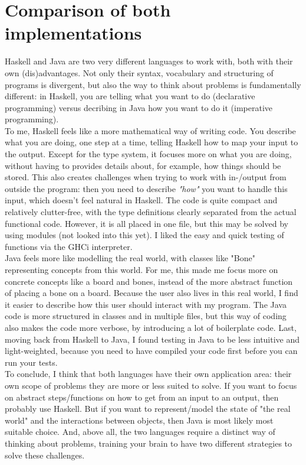 \documentclass[a4paper, 11pt]{article}
\begin{document}
\section{Comparison of both implementations}
Haskell and Java are two very different languages to work with, both with their own (dis)advantages. Not only their syntax, vocabulary and structuring of programs is divergent, but also the way to think about problems is fundamentally different: in Haskell, you are telling what you want to do (declarative programming) versus decribing in Java how you want to do it (imperative programming). \newline 
\\
To me, Haskell feels like a more mathematical way of writing code. You describe what you are doing, one step at a time, telling Haskell how to map your input to the output. Except for the type system, it focuses more on what you are doing, without having to provides details about, for example, how things should be stored. This also creates challenges when trying to work with in-/output from outside the program: then you need to describe \textit{"how"} you want to handle this input, which doesn't feel natural in Haskell. The code is quite compact and relatively clutter-free, with the type definitions clearly separated from the actual functional code. However, it is all placed in one file, but this may be solved by using modules (not looked into this yet). I liked the easy and quick testing of functions via the GHCi interpreter. \newline
\\
Java feels more like modelling the real world, with classes like "Bone" representing concepts from this world. For me, this made me focus more on concrete concepts like a board and bones, instead of the more abstract function of placing a bone on a board. Because the user also lives in this real world, I find it easier to describe how this user should interact with my program. The Java code is more structured in classes and in multiple files, but this way of coding also makes the code more verbose, by introducing a lot of boilerplate code. Last, moving back from Haskell to Java, I found testing in Java to be less intuitive and light-weighted, because you need to have compiled your code first before you can run your tests. \newline
\\
To conclude, I think that both languages have their own application area: their own scope of problems they are more or less suited to solve. If you want to focus on abstract steps/functions on how to get from an input to an output, then probably use Haskell. But if you want to represent/model the state of "the real world" and the interactions between objects, then Java is most likely most suitable choice. And, above all, the two languages require a distinct way of thinking about problems, training your brain to have two different strategies to solve these challenges. 
\end{document}
